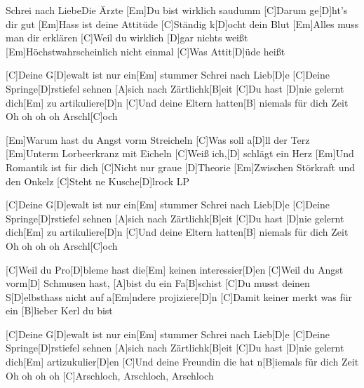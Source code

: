 \documentclass[../main.tex]{subfiles}
\begin{document}
\begin{song}{Schrei nach Liebe}{Die Ärzte}{}
[Em]Du bist wirklich saudumm
[C]Darum ge[D]ht’s dir gut
[Em]Hass ist deine Attitüde
[C]Ständig k[D]ocht dein Blut
[Em]Alles muss man dir erklären
[C]Weil du wirklich [D]gar nichts weißt
[Em]Höchstwahrscheinlich nicht einmal
[C]Was Attit[D]{ü}de heißt

[C]Deine G[D]ewalt ist nur ein[Em] stummer Schrei nach Lieb[D]e
[C]Deine Springe[D]rstiefel sehnen [A]sich nach Zärtlichk[B]eit
[C]Du hast [D]nie gelernt dich[Em] zu artikuliere[D]n
[C]Und deine Eltern hatten[B] niemals für dich Zeit
Oh oh oh  oh Arschl[C]och

[Em]Warum hast du Angst vorm Streicheln
[C]Was soll a[D]ll der Terz
[Em]Unterm Lorbeerkranz mit Eicheln
[C]Weiß ich,[D] schlägt ein Herz
[Em]Und Romantik ist für dich
[C]Nicht nur graue [D]Theorie
[Em]Zwischen Störkraft und den Onkelz
[C]Steht ne Kusche[D]lrock LP

[C]Deine G[D]ewalt ist nur ein[Em] stummer Schrei nach Lieb[D]e
[C]Deine Springe[D]rstiefel sehnen [A]sich nach Zärtlichk[B]eit
[C]Du hast [D]nie gelernt dich[Em] zu artikuliere[D]n
[C]Und deine Eltern hatten[B] niemals für dich Zeit
Oh oh oh  oh Arschl[C]och

[C]Weil du Pro[D]bleme hast die[Em] keinen interessier[D]en
[C]Weil du Angst vorm[D] Schmusen hast, [A]bist du ein Fa[B]schist
[C]Du musst deinen S[D]elbsthass nicht auf a[Em]ndere projiziere[D]n
[C]Damit keiner merkt was für ein [B]lieber Kerl du bist

[C]Deine G[D]ewalt ist nur ein[Em] stummer Schrei nach Lieb[D]e
[C]Deine Springe[D]rstiefel sehnen [A]sich nach Zärtlichk[B]eit
[C]Du hast [D]nie gelernt dich[Em] artizukulier[D]en
[C]Und deine Freundin die hat n[B]iemals für dich Zeit
Oh oh oh  oh [C]Arschloch, Arschloch, Arschloch
\end{song}
\end{document}
